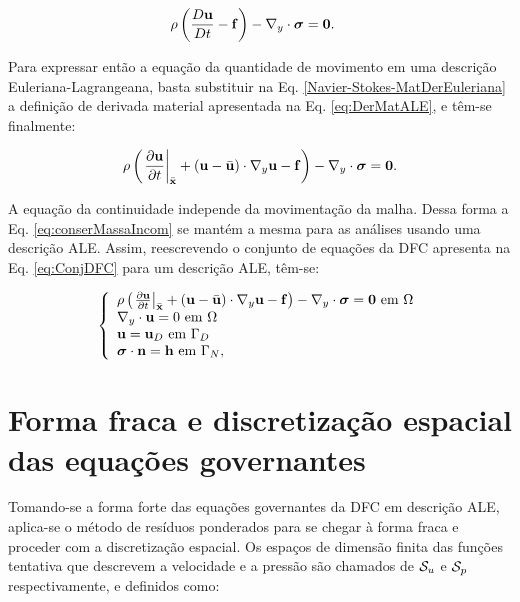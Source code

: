 \documentclass[tese_patricia]{subfiles}%
\begin{document}
\begin{align}
	\rho\left(\frac{D\mathbf{u}}{Dt} - \mathbf{f} \right) - \nabla_y \cdot \boldsymbol{\sigma} &= \mathbf{0}. \label{Navier-Stokes-MatDerEuleriana}
\end{align}

Para expressar então a equação da quantidade de movimento em uma descrição Euleriana-Lagrangeana, basta substituir na Eq. \ref{Navier-Stokes-MatDerEuleriana} a definição de derivada material apresentada na Eq. \ref{eq:DerMatALE}, e têm-se finalmente:

\begin{align}
	\rho\left(\left. \frac{\partial\mathbf{u}}{\partial t} \right|_{\bar{\mathbf{x}}} + \left(\mathbf{u} - \bar{\mathbf{u}} \right) \cdot \nabla_y  \mathbf{u}  - \mathbf{f} \right) - \nabla_y \cdot \boldsymbol{\sigma} = \mathbf{0}. \label{eq:Navier-StokesALE} 
\end{align}

A equação da continuidade independe da movimentação da malha. Dessa forma a Eq. \ref{eq:conserMassaIncom} se mantém a mesma para as análises usando uma descrição ALE. Assim, reescrevendo o conjunto de equações da DFC apresenta na Eq. \ref{eq:ConjDFC} para um descrição ALE, têm-se:

\begin{equation}
	\left\{
	\begin{array}{l}
		\density\left( \left. \frac{\partial\velocity}{\partial t} \right|_{\posALE}  + \left(\velocity - \velocityALE \right)\cdot\nabla_y\velocity - \sbodyforce \right) - \nabla_y \cdot \stresstensor = \mathbf{0}  \ \textrm{em} \ \domain\\
		\nabla_y \cdot \velocity = 0  \ \textrm{em} \ \domain\\
		\velocity = \velocityD \ \textrm{em} \ \GammaD \\
		\stresstensor \cdot \snormal = \surfaceLoad \ \textrm{em} \ \GammaN,
	\end{array} \label{eq:ConjDFCALE}
	\right.
\end{equation}


\section{Forma fraca e discretização espacial das equações governantes} \label{capitulo:Cap2:FormaFraca}

Tomando-se a forma forte das equações governantes da DFC em descrição ALE, aplica-se o método de resíduos ponderados para se chegar à forma fraca e proceder com a discretização espacial. Os espaços de dimensão finita das funções tentativa que descrevem a velocidade e a pressão são chamados de $\mathcal{S}_u$ e $\mathcal{S}_p$ respectivamente, e definidos como:
\end{document}
